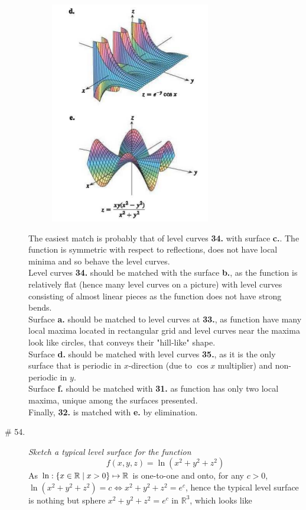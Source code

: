 \documentclass[8pt]{article} %
\begin{document}
\begin{description}
{\begin{figure}[H]
\begin{minipage}{.6\textwidth}
		  \includegraphics[width=.5\linewidth]{surfaces2.png}
		\end{minipage}
		\end{figure}
		The easiest match is probably that of level curves \textbf{34.} with surface \textbf{c.}. The function is symmetric with respect
		to reflections, does not have local minima and so behave the level curves.\\
		Level curves \textbf{34.} should be matched with the surface \textbf{b.}, as the function is relatively flat (hence many level 
		curves on a picture) with level curves consisting of almost linear pieces as the function does not have strong bends.\\
		Surface \textbf{a.} should be matched to level curves at \textbf{33.}, as function have many local maxima located in rectangular
		grid and level curves near the maxima look like circles, that conveys their "hill-like" shape.\\
		Surface \textbf{d.} should be matched with level curves \textbf{35.}, as it is the only surface that is periodic in $x$-direction
		(due to $\cos x$ multiplier) and non-periodic in $y$.\\
		Surface \textbf{f.} should be matched with \textbf{31.} as function has only two local maxima, unique among the surfaces presented.
		\\
		Finally, \textbf{32.} is matched with \textbf{e.} by elimination.
		}
	\item[\# 54.]{{\it Sketch a typical level surface for the function}\[f(x,y,z)=\ln(x^2+y^2+z^2)\]
		As $\ln:\left\{x\in\mathbb{R}\mid x>0\right\}\mapsto\mathbb{R}$ is one-to-one and onto, for any $c>0$, $\ln(x^2+y^2+z^2)=c\iff x^2+y^2+z^2=e^c$, hence the typical
		level surface is nothing but sphere $x^2+y^2+z^2=e^c$ in $\mathbb{R}^3$, which looks like 
		}
\end{description}
\end{document}
